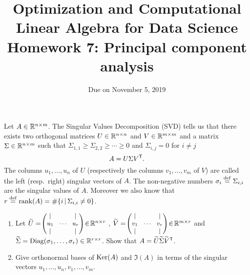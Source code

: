 \documentclass[11pt,nocut]{article}
\title{\vspace{-2.0cm}%
	Optimization and Computational Linear Algebra for Data Science\\
Homework 7: Principal component analysis}
\date{\vspace{-1cm}Due on November 5, 2019}
\begin{document}
\maketitle




\begin{problem}[3 points]
	Let $A \in \mathbb{R}^{n \times m}$. The Singular Values Decomposition (SVD) tells us that there exists two orthogonal matrices $U \in \mathbb{R}^{n \times n}$ and $V \in \mathbb{R}^{m \times m}$ and a matrix $\Sigma \in \mathbb{R}^{n \times m}$ such that $\Sigma_{1,1} \geq \Sigma_{2,2}  \geq \cdots \geq 0$ and $\Sigma_{i,j} = 0$ for $i\neq j$
	$$
	A = U \Sigma V^{{\sf T}}.
	$$
	The columns $u_1, \dots, u_n$ of $U$ (respectively the columns $v_1, \dots, v_m$ of $V$) are called the left (resp.\ right) singular vectors of $A$. The non-negative numbers $\sigma_i \overset{\rm def}{=} \Sigma_{i,i}$ are the singular values of $A$. Moreover we also know that $r \overset{\rm def}{=} {{\rm rank}}(A) = \# \{i \, | \, \Sigma_{i,i} \neq 0 \}$.
	\begin{enumerate}[label=\normalfont(\textbf{\alph*})]
		\item Let 
			$\widetilde{U} = \!
			{\small \begin{pmatrix}
					| & & | \\
					u_1 & \!\cdots\! & u_r \\
					| & & | 
			\end{pmatrix} } \! \in \! \mathbb{R}^{n \times r}$ ,
			$\widetilde{V} = \!
			{\small \begin{pmatrix}
					| & & | \\
					v_1 & \!\cdots\! & v_r \\
					| & & | 
			\end{pmatrix} } \! \in \! \mathbb{R}^{m \times r}$ and
			$\widetilde{\Sigma} = {{\rm Diag}}(\sigma_1, \dots, \sigma_r) \in \mathbb{R}^{r \times r}$.
			Show that $A = \widetilde{U}\widetilde{\Sigma}\widetilde{V}^{{\sf T}}$.
		\item Give orthonormal bases of ${{\rm Ker}}(A)$ and $\Im(A)$ in terms of the singular vectors $u_1, \dots, u_n, v_1, \dots , v_m$.
	\end{enumerate}
\end{problem}

\vspace{1mm}
\end{document}
